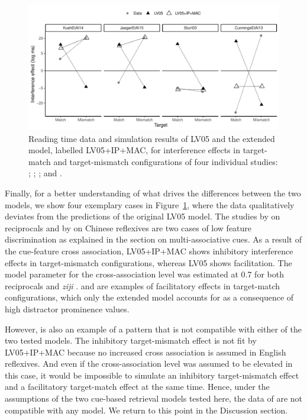 \documentclass{cambridge7A}\usepackage[]{graphicx}\usepackage[]{color}
\begin{document}
\begin{figure}[htbp]
\centering
\includegraphics[width=\textwidth]{figures/fig-simresultsSlct}

  \caption{Reading time data and simulation results of LV05 and the extended model, labelled LV05+IP+MAC, for interference effects in target-match and target-mismatch configurations of four individual studies: \cite{KushPhillips2014}; \cite[][Exp.\ 1]{JaegerEngelmannVasishth2015}; \cite[][Exp.\ 1]{Sturt2003}; and \cite[][Exp.\ 2, participants with low working memory]{CunningsFelser2013}.
  }
  \label{fig:simresultsSlct} 
\end{figure}
%

Finally, for a better understanding of what drives the differences between the two models, we show four exemplary cases in Figure~\ref{fig:simresultsSlct}, where the data qualitatively deviates from the predictions of the original LV05 model. 
The studies by \cite{KushPhillips2014} on reciprocals and by \cite{JaegerEngelmannVasishth2015} on Chinese reflexives are two cases of low feature discrimination as explained in the section on multi-associative cues. As a result of the cue-feature cross association, LV05+IP+MAC shows inhibitory interference effects in target-mismatch configurations, whereas LV05 shows facilitation. 
The model parameter for the cross-association level was estimated at 0.7 for both reciprocals \citep{KushPhillips2014} and \textit{ziji} \citep{JaegerEngelmannVasishth2015}.
\cite{CunningsFelser2013} and \cite{Sturt2003} are examples of facilitatory effects in target-match configurations, which only the extended model accounts for as a consequence of high distractor prominence values.

However, \cite{CunningsFelser2013} is also an example of a pattern that is not compatible with either of the two tested models. The inhibitory target-mismatch effect is not fit by LV05+IP+MAC because no increased cross association is assumed in English reflexives. And even if the cross-association level was assumed to be elevated in this case, it would be impossible to simulate an inhibitory target-mismatch effect and a facilitatory target-match effect at the same time. 
Hence, under the assumptions of the two cue-based retrieval models tested here, the data of \cite{CunningsFelser2013} are not compatible with any model. We return to this point in the Discussion section.
\end{document}
